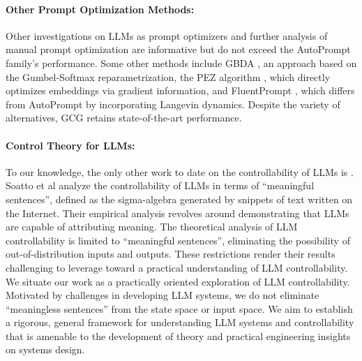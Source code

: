 \documentclass{article} %
\begin{document}
\paragraph{Other Prompt Optimization Methods: } Other investigations on LLMs as prompt optimizers \citep{zhou2023large} and further analysis of manual prompt optimization \citep{reynolds2021prompt} are informative but do not exceed the AutoPrompt family's performance. Some other methods include GBDA \citep{guo2021gradientbased}, an approach based on the Gumbel-Softmax reparametrization, the PEZ algorithm \citep{wen2023hard}, which directly optimizes embeddings via gradient information, and FluentPrompt \citep{shi2022human}, which differs from AutoPrompt by incorporating Langevin dynamics. Despite the variety of alternatives, GCG retains state-of-the-art performance.



\paragraph{Control Theory for LLMs: } To our knowledge, the only other work to date on the controllability of LLMs is \cite{soatto2023taming}. 
Soatto et al analyze the controllability of LLMs in terms of ``meaningful sentences'', defined as the sigma-algebra generated by snippets of text written on the Internet. 
Their empirical analysis revolves around demonstrating that LLMs are capable of attributing meaning. 
The theoretical analysis of LLM controllability is limited to ``meaningful sentences'', eliminating the possibility of out-of-distribution inputs and outputs.
These restrictions render their results challenging to leverage toward a practical understanding of LLM controllability. 
We situate our work as a practically oriented exploration of LLM controllability. 
Motivated by challenges in developing LLM systems, we do not eliminate ``meaningless sentences'' from the state space or input space. 
We aim to establish a rigorous, general framework for understanding LLM systems and controllability that is amenable to the development of theory and practical engineering insights on systems design. 
\end{document}
